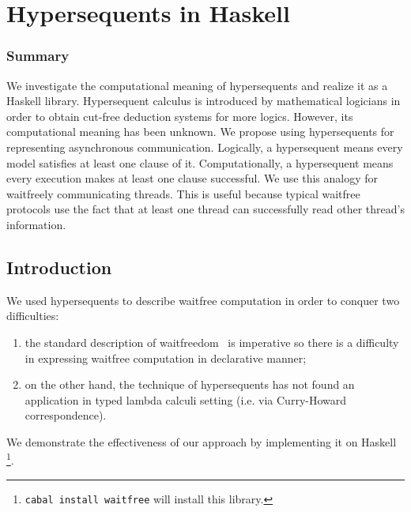 \chapter{Hypersequents in Haskell}
\label{ch:haskell}

\subsection{Summary}

 We investigate the computational meaning of hypersequents and realize
 it as a Haskell library.
 Hypersequent calculus is introduced by mathematical logicians in order
 to obtain cut-free deduction systems for more logics.
 However, its
 computational meaning has been unknown.  We propose using hypersequents
 for representing asynchronous communication.  Logically, a hypersequent
 means every model satisfies at least one clause of it.
 Computationally, a hypersequent
 means every execution makes at least one clause
 successful.
 We use this analogy
 for waitfreely communicating threads.  This is useful
 because typical waitfree protocols use the fact that at least one thread
 can successfully read other thread's information.

\iffalse
\begin{code}
 {-# LANGUAGE TypeOperators, MultiParamTypeClasses, FunctionalDependencies, FlexibleInstances, UndecidableInstances #-}

module Control.Concurrent.Waitfree
    ( ZeroT
    , SucT
    , HNil
    , HCons
    , (:*:)
    , K
    , single
    , Thread (t, atid)
    , AbstractThreadId
    , peek
    , comm
    , follows
    , execute
    , choice
    , cycling
    , exchange
    , (-*-)
    )
    where

import Control.Concurrent (ThreadId, forkIO, killThread)
import Control.Concurrent.MVar (MVar, tryPutMVar, readMVar,
 newEmptyMVar, tryTakeMVar)
import qualified Data.Map as Map
\end{code}
\fi

\section{Introduction}


We used hypersequents to describe waitfree computation in order to
conquer two difficulties:
\begin{enumerate}
 \item the standard description of waitfreedom~\cite{multiprocessor}
is imperative so there is a difficulty in
expressing waitfree computation in declarative manner;
 \item  on the
other hand, the technique of hypersequents has not found an
application in typed lambda calculi setting (i.e. via Curry-Howard correspondence).
\end{enumerate}
We demonstrate the effectiveness of our approach by implementing it on
Haskell%
\footnote{\texttt{cabal install waitfree} will install this library.}.

